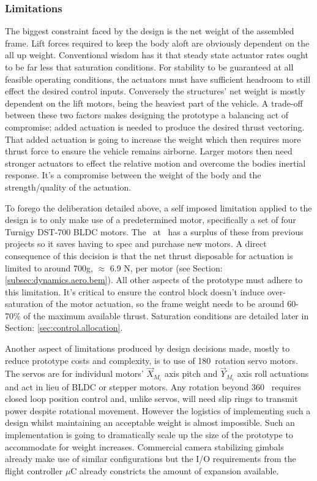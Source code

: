 \subsubsection{Limitations}
\label{subsubsec:intro.foreword.limits}
The biggest constraint faced by the design is the net weight of the assembled frame. Lift forces required to keep the body aloft are obviously dependent on the all up weight. Conventional wisdom has it that steady state actuator rates ought to be far less that saturation conditions. For stability to be guaranteed at all feasible operating conditions, the actuators must have sufficient headroom to still effect the desired control inputs. Conversely the structures' net weight is mostly dependent on the lift motors, being the heaviest part of the vehicle. A trade-off between these two factors makes designing the prototype a balancing act of compromise; added actuation is needed to produce the desired thrust vectoring. That added actuation is going to increase the weight which then requires more thrust force to ensure the vehicle remains airborne. Larger motors then need stronger actuators to effect the relative motion and overcome the bodies inertial response. It's a compromise between the weight of the body and the strength/quality of the actuation.
\par
To forego the deliberation detailed above, a self imposed limitation applied to the design is to only make use of a predetermined motor, specifically a set of four Turnigy DST-700 BLDC motors. The \dept ~at \uni ~has a surplus of these from previous projects so it saves having to spec and purchase new motors. A direct consequence of this decision is that the net thrust disposable for actuation is limited to around 700g, $\approx$ 6.9 N, per motor (see Section: \ref{subsec:dynamics.aero.bem}). All other aspects of the prototype must adhere to this limitation. It's critical to ensure the control block doesn't induce over-saturation of the motor actuation, so the frame weight needs to be around 60-70\% of the maximum available thrust. Saturation conditions are detailed later in Section: \ref{sec:control.allocation}.
\par
Another aspect of limitations produced by design decisions made, mostly to reduce prototype costs and complexity, is to use of 180\textdegree ~rotation servo motors. The servos are for individual motors' $\vec{X}_{M_i}$ axis pitch and $\vec{Y}_{M_i}$ axis roll actuations and act in lieu of BLDC or stepper motors. Any rotation beyond 360\textdegree~ requires closed loop position control and, unlike servos, will need slip rings to transmit power despite rotational movement. However the logistics of implementing such a design whilst maintaining an acceptable weight is almost impossible. Such an implementation is going to dramatically scale up the size of the prototype to accommodate for weight increases. Commercial camera stabilizing gimbals already make use of similar configurations but the I/O requirements from the flight controller $\mu$C already constricts the amount of expansion available.
